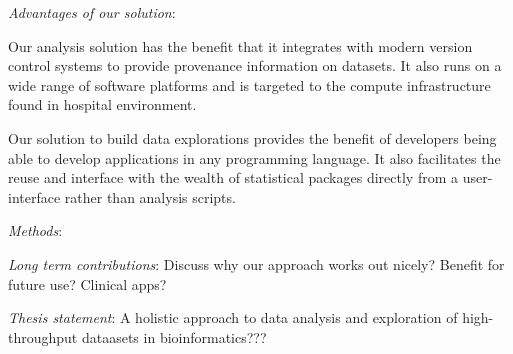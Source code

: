 \emph{Advantages of our solution}:

Our analysis solution has the benefit that it integrates with modern version
control systems to provide provenance information on datasets. It also runs on a
wide range of software platforms and is targeted to the compute infrastructure
found in hospital environment. 

Our solution to build data explorations provides the benefit of developers being
able to develop applications in any programming language. It also facilitates
the reuse and interface with the wealth of statistical packages directly from a
user-interface rather than analysis scripts. 

\emph{Methods}:

\emph{Long term contributions}:
Discuss why our approach works out nicely? Benefit for future use? Clinical
apps? 

\emph{Thesis statement}:
A holistic approach to data analysis and exploration of high-throughput
dataasets in bioinformatics??? 


